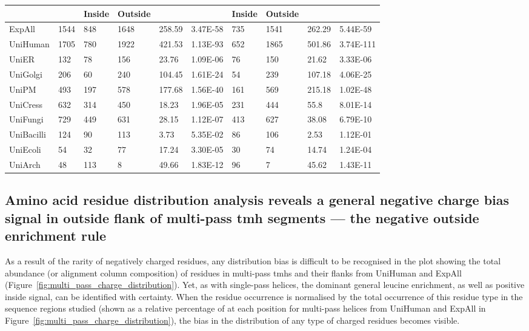 \begin{table}[htbp!]
{\begin{tabular}{p{5em}lllllllll}
 \cmidrule{3-4}\cmidrule{7-8}    \multicolumn{1}{c}{} &       & \multicolumn{1}{p{5em}}{\textbf{Inside}} & \multicolumn{1}{p{5em}}{\textbf{Outside}} &       &       & \multicolumn{1}{p{5em}}{\textbf{Inside}} & \multicolumn{1}{p{5em}}{\textbf{Outside}} &       &  \\
     \midrule
     ExpAll & 1544  & 848   & 1648  & 258.59 & 3.47E-58 & 735   & 1541  & 262.29 & 5.44E-59 \\
     \midrule
     UniHuman & 1705  & 780   & 1922  & 421.53 & 1.13E-93 & 652   & 1865  & 501.86 & 3.74E-111 \\
     \midrule
     UniER & 132   & 78    & 156   & 23.76 & 1.09E-06 & 76    & 150   & 21.62 & 3.33E-06 \\
     \midrule
     UniGolgi & 206   & 60    & 240   & 104.45 & 1.61E-24 & 54    & 239   & 107.18 & 4.06E-25 \\
     \midrule
     UniPM & 493   & 197   & 578   & 177.68 & 1.56E-40 & 161   & 569   & 215.18 & 1.02E-48 \\
     \midrule
     UniCress & 632   & 314   & 450   & 18.23 & 1.96E-05 & 231   & 444   & 55.8  & 8.01E-14 \\
     \midrule
     UniFungi & 729   & 449   & 631   & 28.15 & 1.12E-07 & 413   & 627   & 38.08 & 6.79E-10 \\
     \midrule
     UniBacilli & 124   & 90    & 113   & 3.73  & 5.35E-02 & 86    & 106   & 2.53  & 1.12E-01 \\
     \midrule
     UniEcoli & 54    & 32    & 77    & 17.24 & 3.30E-05 & 30    & 74    & 14.74 & 1.24E-04 \\
     \midrule
     UniArch & 48    & 113   & 8     & 49.66 & 1.83E-12 & 96    & 7     & 45.62 & 1.43E-11 \\
     \bottomrule
     \end{tabular}}%
     \label{table:negativeskewsinglepass}

    \end{table}%

\subsection{Amino acid residue distribution analysis reveals a general negative charge bias signal in outside flank of multi-pass \gls{tmh} segments --- the negative outside enrichment rule}

As a result of the rarity of negatively charged residues, any distribution bias is difficult to be recognised in the plot showing the total abundance (or alignment column composition) of residues in multi-pass \gls{tmh}s and their flanks from UniHuman and ExpAll (Figure~\ref{fig:multi_pass_charge_distribution}).
Yet, as with single-pass helices, the dominant general leucine enrichment, as well as positive inside signal, can be identified with certainty.
When the residue occurrence is normalised by the total occurrence of this residue type in the sequence regions studied (shown as a relative percentage of at each position for multi-pass helices from UniHuman and ExpAll  in Figure~\ref{fig:multi_pass_charge_distribution}), the bias in the distribution of any type of charged residues becomes visible.

